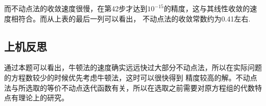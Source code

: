 \documentclass{ctexart}
\begin{document}
而不动点法的收敛速度很慢，在第42步才达到$10^{-15}$的精度，这与其线性收敛的速度相符合。而从上表的最后一列可以看出，
不动点法的收敛常数约为0.41左右.
\subsection{上机反思}
通过本题可以看出，牛顿法的速度确实远远快过大部分不动点法，所以在实际问题的方程数较少的时候优先考虑牛顿法，这时可以很快得到
精度较高的解。不动点法与所选取的等价不动点迭代函数有关，所以在选取之前需要对原方程组的代数特点有理论上的研究。
\end{document}
